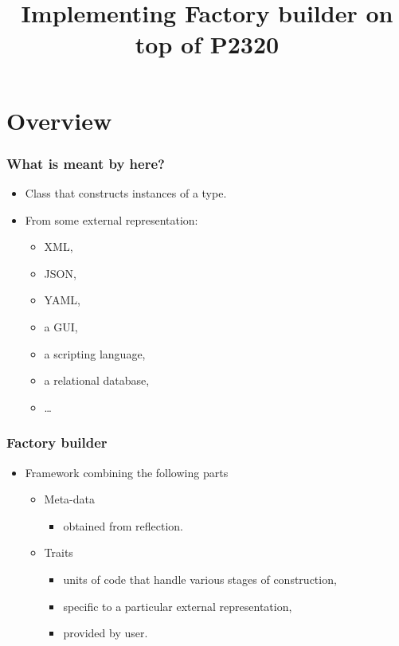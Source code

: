 \documentclass[compress,table,xcolor=table]{beamer}
\begin{document}
\title{Implementing Factory builder on top of P2320}
\section{Overview}
\frame{\titlepage}
\begin{frame}
	\Huge
	\vfill
	\LARGE
\end{frame}
\begin{frame}
\frametitle{What is meant by  here?}
  \Large
  \begin{itemize}
	  \item Class that constructs instances of a  type.
	  \item From some external representation:
  	\begin{itemize}
		\large
	  \item XML,
	  \item JSON,
	  \item YAML,
	  \item a GUI,
	  \item a scripting language,
	  \item a relational database,
	  \item \ldots
  	\end{itemize}
  \end{itemize}
\end{frame}
\begin{frame}
  \frametitle{Factory builder}
	\Huge
  \begin{itemize}
	\item{Framework combining the following parts}
	\begin{itemize}
  	\LARGE
	\item Meta-data 
      	\begin{itemize}
  		\Large
		\item obtained from reflection.
      	\end{itemize}
	\item Traits
      	\begin{itemize}
  		\Large
		\item units of code that handle various stages of construction,
		\item specific to a particular external representation,
		\item provided by user.
		\end{itemize}
      \end{itemize}
  \end{itemize}
\end{frame}
\end{document}
